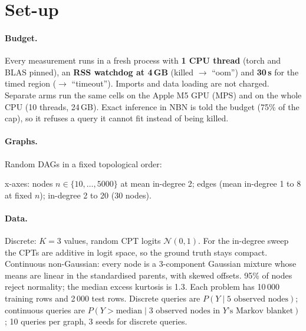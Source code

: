 \documentclass[10pt,a4paper]{article}
\begin{document}
\section{Set-up}

\paragraph{Budget.} Every measurement runs in a fresh process with \textbf{1 CPU thread} (torch
and BLAS pinned), an \textbf{RSS watchdog at 4\,GB} (killed $\to$ ``oom'') and \textbf{30\,s}
for the timed region ($\to$ ``timeout''). Imports and data loading are not charged. Separate
arms run the same cells on the Apple M5 GPU (MPS) and on the whole CPU (10 threads, 24\,GB).
Exact inference in NBN is told the budget (75\% of the cap), so it refuses a query it cannot fit
instead of being killed.

\paragraph{Graphs.} Random DAGs in a fixed topological order:
\begin{center}\small{}\end{center}
x-axes: nodes $n\in\{10,\dots,5000\}$ at mean in-degree 2; edges (mean in-degree 1 to 8 at fixed
$n$); in-degree 2 to 20 (30 nodes).

\paragraph{Data.} Discrete: $K=3$ values, random CPT logits $\mathcal N(0,1)$. For the
in-degree sweep the CPTs are additive in logit space, so the ground truth stays compact.
Continuous non-Gaussian: every node is a 3-component Gaussian mixture whose means are linear in
the standardised parents, with skewed offsets. 95\% of nodes reject normality; the median excess
kurtosis is 1.3. Each problem has 10\,000 training rows and 2\,000 test rows. Discrete queries
are $P(Y \mid 5 \text{ observed nodes})$; continuous queries are
$P(Y>\mathrm{median}\mid 3 \text{ observed nodes in } Y\text{'s Markov blanket})$; 10 queries
per graph, 3 seeds for discrete queries.
\end{document}
